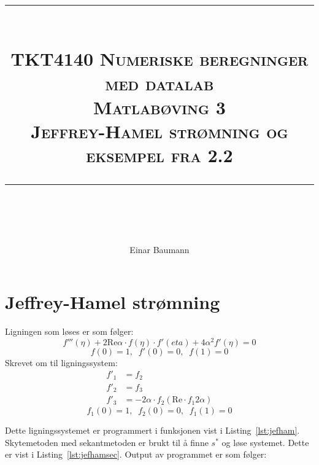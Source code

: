





\author{Einar Baumann}
\title{
    \vspace{-1in}
    \vspace{0.1in}
    \rule{\textwidth}{0.5pt} \\[0.5cm]
    \normalfont \normalsize \textsc{TKT4140 Numeriske beregninger med datalab} \\ [20pt]
    {\textsc{ \huge Matlabøving 3 }} \\ [0.5cm]
    {\textsc {\Large Jeffrey-Hamel strømning og eksempel fra 2.2} } \\
    \vspace{0.1in}
    \rule{\textwidth}{2pt} \\[0.7cm]
}


\maketitle
\thispagestyle{empty}
\clearpage

\section{Jeffrey-Hamel strømning} %
\label{sec:jeffrey_hamel_str_mning}
Ligningen som løses er som følger:
\begin{equation}
  f'''(\eta) + 2 \mathrm{Re} \alpha \cdot f(\eta) \cdot f'(eta) + 4 \alpha^2 f'(\eta) = 0
\end{equation}
\begin{equation}
  \tag{b}
  f(0) = 1, \;\; f'(0) = 0, \;\; f(1) = 0
\end{equation}
Skrevet om til ligningssystem:
\begin{subequations}
\begin{align}
  f'_1 &= f_2 \\
  f'_2 &= f_3 \\
  f'_3 &= -2 \alpha \cdot f_2 \left( \mathrm{Re}\cdot f_1 2 \alpha \right)
\end{align}
\end{subequations}
\begin{equation}
  \tag{b}
  f_1(0) = 1, \;\; f_2(0) = 0, \;\; f_1(1) = 0
\end{equation}

Dette ligningssystemet er programmert i funksjonen vist i Listing~\ref{lst:jefham}. Skytemetoden med sekantmetoden er brukt til å finne $s^*$ og løse systemet. Dette er vist i Listing~\ref{lst:jefhamsec}. Output av programmet er som følger:


